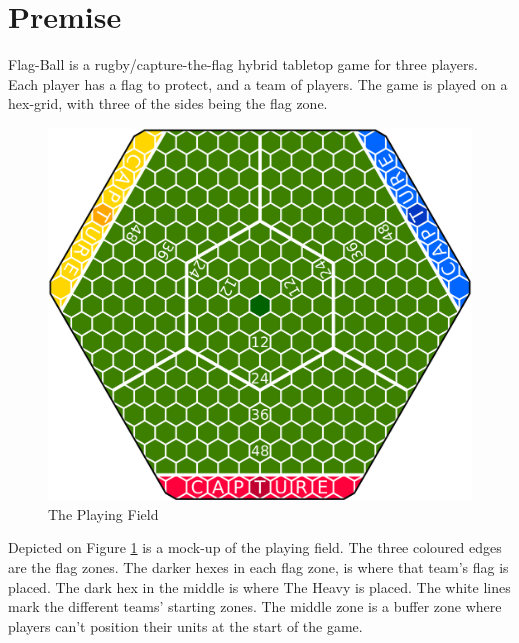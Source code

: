 



\maketitle

\section*{Premise}
Flag-Ball is a rugby/capture-the-flag hybrid tabletop game for three players.
Each player has a flag to protect, and a team of players.
The game is played on a hex-grid, with three of the sides being the flag zone.
\begin{figure}
    \centering
    \includegraphics[width=\textwidth]{graphics/board-2}
    \caption{The Playing Field}
    \label{fig:court}
\end{figure}
Depicted on Figure \ref{fig:court} is a mock-up of the playing field.
The three coloured edges are the flag zones.
The darker hexes in each flag zone, is where that team's flag is placed.
The dark hex in the middle is where The Heavy is placed.
The white lines mark the different teams' starting zones.
The middle zone is a buffer zone where players can’t position their units at the start of the game.

\tableofcontents





